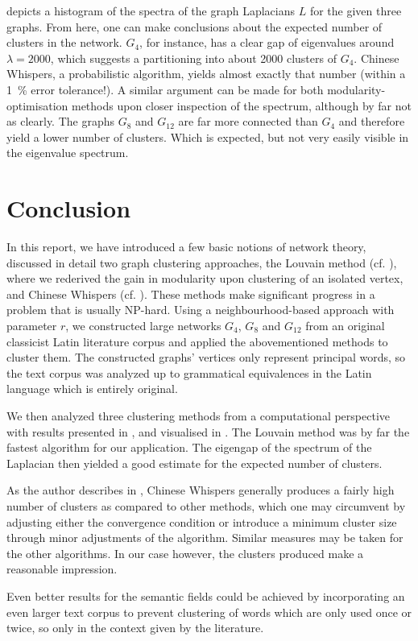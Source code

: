 \documentclass[12pt, a4paper]{article}
\begin{document}
   depicts a histogram of the spectra of the graph Laplacians $L$ for the given three graphs.
  From here, one can make conclusions about the expected number of clusters in the network. $G_4$, for instance, has a clear gap of eigenvalues around $\lambda = 2000$, which suggests a partitioning into about 2000 clusters of $G_4$. Chinese Whispers, a probabilistic algorithm, yields almost exactly that number (within a \SI{1}{\percent} error tolerance!).
  A similar argument can be made for both modularity-optimisation methods upon closer inspection of the spectrum, although by far not as clearly.
  The graphs $G_8$ and $G_{12}$ are far more connected than $G_4$ and therefore yield a lower number of clusters.
  Which is expected, but not very easily visible in the eigenvalue spectrum.

  \pagebreak
  \section{Conclusion}
  In this report, we have introduced a few basic notions of network theory, discussed in detail two graph clustering approaches, the Louvain method (cf. ), where we rederived the gain in modularity upon clustering of an isolated vertex, and Chinese Whispers (cf. ).
  These methods make significant progress in a problem that is usually NP-hard.
  Using a neighbourhood-based approach with parameter $r$, we constructed large networks $G_4$, $G_8$ and $G_{12}$ from an original classicist Latin literature corpus and applied the abovementioned methods to cluster them.
  The constructed graphs' vertices only represent principal words, so the text corpus was analyzed up to grammatical equivalences in the Latin language which is entirely original.

  We then analyzed three clustering methods from a computational perspective with results presented in ,  and visualised in .
  The Louvain method was by far the fastest algorithm for our application.
  The eigengap of the spectrum of the Laplacian then yielded a good estimate for the expected number of clusters.

  As the author describes in \cite{cw-biemann}, Chinese Whispers generally produces a fairly high number of clusters as compared to other methods, which one may circumvent by adjusting either the convergence condition or introduce a minimum cluster size through minor adjustments of the algorithm.
  Similar measures may be taken for the other algorithms.
  In our case however, the clusters produced make a reasonable impression.

  Even better results for the semantic fields could be achieved by incorporating an even larger text corpus to prevent clustering of words which are only used once or twice, so only in the context given by the literature.

  \pagebreak
  \printbibliography
\end{document}
